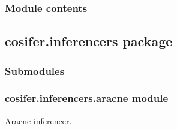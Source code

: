 \documentclass[letterpaper,10pt,english]{sphinxmanual}
\begin{document}
\begin{fulllineitems}
\begin{fulllineitems}
\begin{description}
\end{description}

\end{fulllineitems}


\begin{fulllineitems}
\end{fulllineitems}


\end{fulllineitems}



\subsubsection{Module contents}
\label{\detokenize{_modules/cosifer.handlers:module-cosifer.handlers}}\label{\detokenize{_modules/cosifer.handlers:module-contents}}

\subsection{cosifer.inferencers package}
\label{\detokenize{_modules/cosifer.inferencers:cosifer-inferencers-package}}\label{\detokenize{_modules/cosifer.inferencers::doc}}

\subsubsection{Submodules}
\label{\detokenize{_modules/cosifer.inferencers:submodules}}

\subsubsection{cosifer.inferencers.aracne module}
\label{\detokenize{_modules/cosifer.inferencers:module-cosifer.inferencers.aracne}}\label{\detokenize{_modules/cosifer.inferencers:cosifer-inferencers-aracne-module}}
Aracne inferencer.
\end{document}
